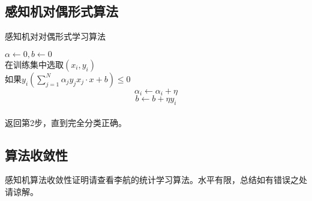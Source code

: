 \documentclass[twocolumn]{article}
\begin{document}
	\subsection{感知机对偶形式算法}
		\begin{algorithm}
		\caption{感知机对对偶形式学习算法}
		\LinesNumbered
		
		$\alpha \leftarrow 0,b\leftarrow 0$ \\
		在训练集中选取$(x_{i},y_{i})$\\
		如果$y_{i}(\sum_{j=1}^{N}\alpha _{j}y_{j}x_{j}\cdot x + b)\leq 0$ 
		$$\alpha _{i}\leftarrow \alpha _{i}+\eta $$
		$$b\leftarrow b+\eta y_{i}$$\\
		返回第2步，直到完全分类正确。
	\end{algorithm}
	\subsection{算法收敛性}
	感知机算法收敛性证明请查看李航的统计学习算法。水平有限，总结如有错误之处请谅解。
\end{document}
